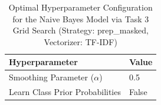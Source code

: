 \begin{table}[H]
    \centering
    \caption{Optimal Hyperparameter Configuration for the Naive Bayes Model via Task 3 Grid Search (Strategy: prep_masked, Vectorizer: TF-IDF)}
    \label{tab:task3_mnb_hyperparameters}
    \small
    \begin{tabular}{ll}
    \toprule
    \textbf{Hyperparameter} & \textbf{Value} \\
    \midrule
    Smoothing Parameter ($\alpha$) & 0.5 \\
    Learn Class Prior Probabilities & False \\
    \bottomrule
    \end{tabular}
    \end{table}
